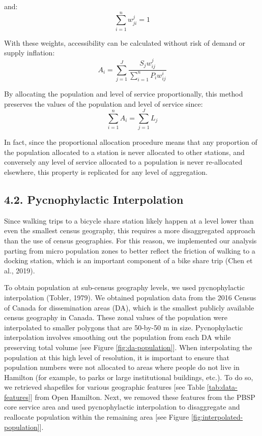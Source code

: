\documentclass[]{elsarticle} %
\begin{document}
\noindent and: \begin{equation}
\label{eq:weights-2}
\sum_{i = 1}^{n} {w^j_{ji}} = 1
\end{equation}

With these weights, accessibility can be calculated without risk of
demand or supply inflation: \begin{equation}
\label{eq:balanced-accessibility}
A_i = {\sum_{j = 1}^{J} \frac {S_j{w^j_{ij}}}{\sum_{i = 1}^{n} P_i{w^i_{ij}}}}
\end{equation}

By allocating the population and level of service proportionally, this
method preserves the values of the population and level of service
since: \begin{equation}
\label{eq:proportionality}
\sum_{i=1}^n A_i = \sum_{j=1}^J L_j
\end{equation}

In fact, since the proportional allocation procedure means that any
proportion of the population allocated to a station is never allocated
to other stations, and conversely any level of service allocated to a
population is never re-allocated elsewhere, this property is replicated
for any level of aggregation.

\hypertarget{pycnophylactic-interpolation}{%
\subsection{4.2. Pycnophylactic
Interpolation}\label{pycnophylactic-interpolation}}

Since walking trips to a bicycle share station likely happen at a level
lower than even the smallest census geography, this requires a more
disaggregated approach than the use of census geographies. For this
reason, we implemented our analysis parting from micro population zones
to better reflect the friction of walking to a docking station, which is
an important component of a bike share trip (Chen et al., 2019).

To obtain population at sub-census geography levels, we used
pycnophylactic interpolation (Tobler, 1979). We obtained population data
from the 2016 Census of Canada for dissemination areas (DA), which is
the smallest publicly available census geography in Canada. These zonal
values of the population were interpolated to smaller polygons that are
50-by-50 m in size. Pycnophylactic interpolation involves smoothing out
the population from each DA while preserving total volume {[}see Figure
\ref{fig:da-population}{]}. When interpolating the population at this
high level of resolution, it is important to ensure that population
numbers were not allocated to areas where people do not live in Hamilton
(for example, to parks or large institutional buildings, etc.). To do
so, we retrieved shapefiles for various geographic features {[}see Table
\ref{tab:data-features}{]} from Open Hamilton. Next, we removed these
features from the PBSP core service area and used pycnophylactic
interpolation to disaggregate and reallocate population within the
remaining area {[}see Figure \ref{fig:interpolated-population}{]}.
\end{document}
